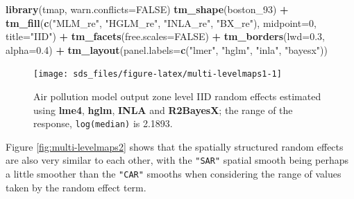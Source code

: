 \documentclass[]{book}
\newenvironment{Shaded}{\begin{snugshade}}{\end{snugshade}}
\newcommand{\DataTypeTok}[1]{\textcolor[rgb]{0.13,0.29,0.53}{#1}}
\newcommand{\DecValTok}[1]{\textcolor[rgb]{0.00,0.00,0.81}{#1}}
\newcommand{\FloatTok}[1]{\textcolor[rgb]{0.00,0.00,0.81}{#1}}
\newcommand{\KeywordTok}[1]{\textcolor[rgb]{0.13,0.29,0.53}{\textbf{#1}}}
\newcommand{\NormalTok}[1]{#1}
\newcommand{\OperatorTok}[1]{\textcolor[rgb]{0.81,0.36,0.00}{\textbf{#1}}}
\newcommand{\OtherTok}[1]{\textcolor[rgb]{0.56,0.35,0.01}{#1}}
\newcommand{\StringTok}[1]{\textcolor[rgb]{0.31,0.60,0.02}{#1}}
\begin{document}
\begin{Shaded}
\begin{Highlighting}[]
\KeywordTok{library}\NormalTok{(tmap, }\DataTypeTok{warn.conflicts=}\OtherTok{FALSE}\NormalTok{)}
\KeywordTok{tm_shape}\NormalTok{(boston_}\DecValTok{93}\NormalTok{) }\OperatorTok{+}\StringTok{ }\KeywordTok{tm_fill}\NormalTok{(}\KeywordTok{c}\NormalTok{(}\StringTok{"MLM_re"}\NormalTok{, }\StringTok{"HGLM_re"}\NormalTok{, }\StringTok{"INLA_re"}\NormalTok{, }\StringTok{"BX_re"}\NormalTok{), }\DataTypeTok{midpoint=}\DecValTok{0}\NormalTok{,}
    \DataTypeTok{title=}\StringTok{"IID"}\NormalTok{)  }\OperatorTok{+}\StringTok{ }\KeywordTok{tm_facets}\NormalTok{(}\DataTypeTok{free.scales=}\OtherTok{FALSE}\NormalTok{) }\OperatorTok{+}\StringTok{ }\KeywordTok{tm_borders}\NormalTok{(}\DataTypeTok{lwd=}\FloatTok{0.3}\NormalTok{, }\DataTypeTok{alpha=}\FloatTok{0.4}\NormalTok{) }\OperatorTok{+}\StringTok{ }
\StringTok{    }\KeywordTok{tm_layout}\NormalTok{(}\DataTypeTok{panel.labels=}\KeywordTok{c}\NormalTok{(}\StringTok{"lmer"}\NormalTok{, }\StringTok{"hglm"}\NormalTok{, }\StringTok{"inla"}\NormalTok{, }\StringTok{"bayesx"}\NormalTok{))}
\end{Highlighting}
\end{Shaded}

\begin{figure}

{\centering \texttt{[image: sds\_files/figure-latex/multi-levelmaps1-1]} 

}

\caption{Air pollution model output zone level IID random effects estimated using \textbf{lme4}, \textbf{hglm}, \textbf{INLA} and \textbf{R2BayesX}; the range of the response, \texttt{log(median)} is 2.1893.}\label{fig:multi-levelmaps1}
\end{figure}

Figure \ref{fig:multi-levelmaps2} shows that the spatially structured random effects are also very similar to each other, with the \texttt{"SAR"} spatial smooth being perhaps a little smoother than the \texttt{"CAR"} smooths when considering the range of values taken by the random effect term.
\end{document}
